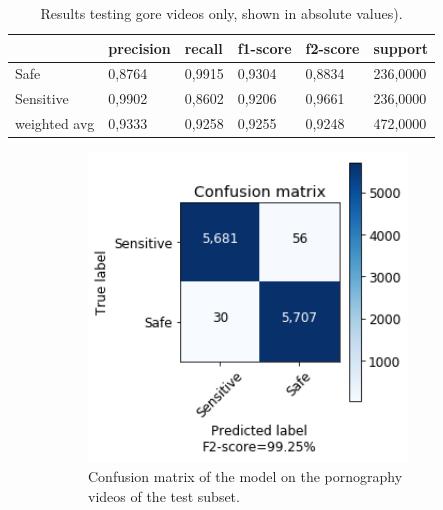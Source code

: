 \begin{table}[!ht]
\centering
\caption{Results testing gore videos only, shown in absolute values).}
\begin{tabular}{l|l|l|l|l|l}
             & precision & recall & f1-score & f2-score & support  \\ \hline
Safe         & 0,8764    & 0,9915 & 0,9304   & 0,8834   & 236,0000 \\ \hline
Sensitive    & 0,9902    & 0,8602 & 0,9206   & 0,9661   & 236,0000 \\ \hline
weighted avg & 0,9333    & 0,9258 & 0,9255   & 0,9248   & 472,0000
\end{tabular}
\label{tab:test-gore-results}
\end{table}

\begin{figure}[!ht]
    \centering
    \begin{subfigure}[b]{0.49\textwidth}
        \includegraphics[width=0.93\textwidth]{img/results/MLP-TEST-PORN.png}
        \caption{Confusion matrix of the model on the pornography videos of the test subset.}
        \label{fig:cf-test-porn}
    \end{subfigure}
    \begin{subfigure}[b]{0.49\textwidth}

\end{subfigure}
\end{figure}
